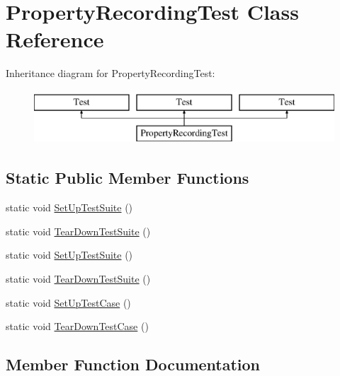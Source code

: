 \hypertarget{class_property_recording_test}{}\section{Property\+Recording\+Test Class Reference}
\label{class_property_recording_test}
Inheritance diagram for Property\+Recording\+Test\+:\begin{figure}[H]
\begin{center}
\leavevmode
\includegraphics[height=2.000000cm]{de/d29/class_property_recording_test}
\end{center}
\end{figure}
\subsection*{Static Public Member Functions}
\begin{DoxyCompactItemize}
\item 
static void \mbox{\hyperlink{class_property_recording_test_af50508f07246f73711510e081ba43eaa}{Set\+Up\+Test\+Suite}} ()
\item 
static void \mbox{\hyperlink{class_property_recording_test_ad6a000f710b6ecc7ee06a74ca722668b}{Tear\+Down\+Test\+Suite}} ()
\item 
static void \mbox{\hyperlink{class_property_recording_test_af50508f07246f73711510e081ba43eaa}{Set\+Up\+Test\+Suite}} ()
\item 
static void \mbox{\hyperlink{class_property_recording_test_ad6a000f710b6ecc7ee06a74ca722668b}{Tear\+Down\+Test\+Suite}} ()
\item 
static void \mbox{\hyperlink{class_property_recording_test_a673c9dfcd9f0c8d10d0df765852c1669}{Set\+Up\+Test\+Case}} ()
\item 
static void \mbox{\hyperlink{class_property_recording_test_ac0d2d47efbdc4399777dffca6071d15d}{Tear\+Down\+Test\+Case}} ()
\end{DoxyCompactItemize}


\subsection{Member Function Documentation}
\mbox{\label{class_property_recording_test_a673c9dfcd9f0c8d10d0df765852c1669}} 
